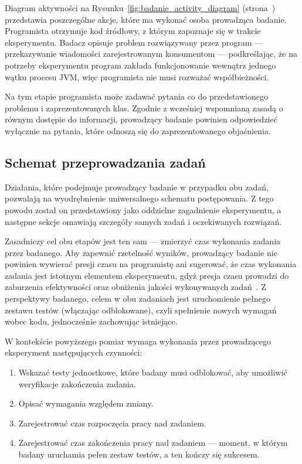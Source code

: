 Diagram aktywności na Rysunku~\ref{fig:badanie_activity_diagram} (strona~\pageref{fig:badanie_activity_diagram})
przedstawia poszczególne akcje, które ma wykonać osoba prowadząca badanie.
Programista otrzymuje kod źródłowy, z którym zapoznaje się w trakcie eksperymentu.
Badacz opisuje problem rozwiązywany przez program --- przekazywanie wiadomości zarejestrowanym konsumentom ---
podkreślając, że na potrzeby eksperymentu program zakłada funkcjonowanie wewnątrz jednego wątku procesu JVM, więc
programista nie musi rozważać współbieżności.

Na tym etapie programista może zadawać pytania co do przedstawionego problemu i zaprezentowanych klas.
Zgodnie z wcześniej wspomnianą zasadą o równym dostępie do informacji, prowadzący badanie powinien odpowiedzieć
wyłącznie na pytania, które odnoszą się do zaprezentowanego objaśnienia.

\subsection{Schemat przeprowadzania zadań}

Działania, które podejmuje prowadzący badanie w przypadku obu zadań, pozwalają na wyodrębnienie uniwersalnego schematu
postępowania.
Z tego powodu został on przedstawiony jako oddzielne zagadnienie eksperymentu, a następne sekcje
omawiają szczegóły samych zadań i oczekiwanych rozwiązań.

Zasadniczy cel obu etapów jest ten sam --- zmierzyć czas wykonania zadania przez badanego.
Aby zapewnić rzetelność wyników, prowadzący badanie nie powinien wywierać presji czasu na programistę ani sugerować, że
czas wykonania zadania jest istotnym elementem eksperymentu, gdyż presja czasu prowadzi do zaburzenia efektywności oraz
obniżenia jakości wykonywanych zadań~\cite{moore2012}.
Z perspektywy badanego, celem w obu zadaniach jest uruchomienie pełnego zestawu testów (włączając odblokowane),
czyli spełnienie nowych wymagań wobec kodu, jednocześnie zachowując istniejące.

W kontekście powyższego pomiar wymaga wykonania przez prowadzącego eksperyment następujących czynności:

\begin{enumerate}
    \item Wskazać testy jednostkowe, które badany musi odblokować, aby umożliwić weryfikacje zakończenia zadania.
    \item Opisać wymagania względem zmiany.
    \item Zarejestrować czas rozpoczęcia pracy nad zadaniem.
    \item Zarejestrować czas zakończenia pracy nad zadaniem --- moment, w którym badany uruchamia pełen zestaw testów,
    a ten kończy się sukcesem.
\end{enumerate}

